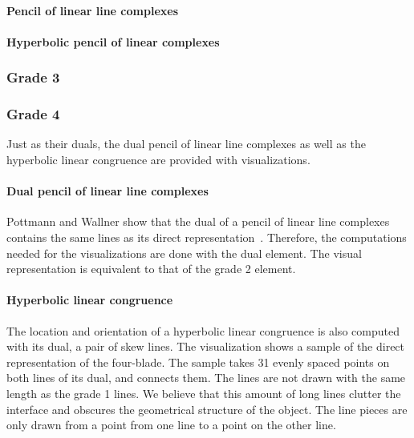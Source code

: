 \paragraph{Pencil of linear line complexes}

\paragraph{Hyperbolic pencil of linear complexes}



\subsubsection{Grade 3}



\subsubsection{Grade 4}
Just as their duals, the dual pencil of linear line complexes as well as the hyperbolic linear congruence are provided with visualizations.

\paragraph{Dual pencil of linear line complexes}
Pottmann and Wallner show that the dual of a pencil of linear line complexes contains the same lines as its direct representation~\cite[Section 3.2.1]{Pottmann}.  Therefore, the computations needed for the visualizations are done with the dual element.  The visual representation is equivalent to that of the grade 2 element.

\paragraph{Hyperbolic linear congruence}
The location and orientation of a hyperbolic linear congruence is also computed with its dual, a pair of skew lines.  The visualization shows a sample of the direct representation of the four-blade.  The sample takes 31 evenly spaced points on both lines of its dual, and connects them.  The lines are not drawn with the same length as the grade 1 lines.  We believe that this amount of long lines clutter the interface and obscures the geometrical structure of the object.  The line pieces are only drawn from a point from one line to a point on the other line.

